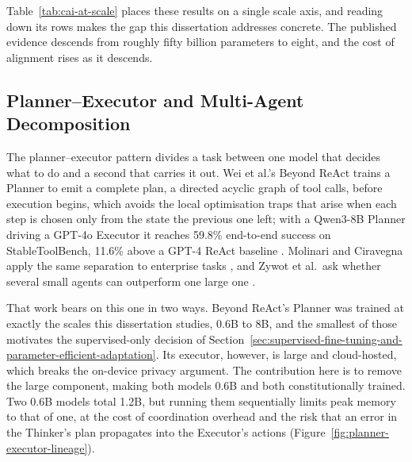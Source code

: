 Table~\ref{tab:cai-at-scale} places these results on a single scale axis, and reading down its rows makes the gap this dissertation addresses concrete. The published evidence descends from roughly fifty billion parameters to eight, and the cost of alignment rises as it descends. 

\subsection{Planner--Executor and Multi-Agent Decomposition}
\label{sec:sota-planner-executor}

The planner--executor pattern divides a task between one model that decides what to do and a second that carries it out. Wei et al.'s Beyond ReAct trains a Planner to emit a complete plan, a directed acyclic graph of tool calls, before execution begins, which avoids the local optimisation traps that arise when each step is chosen only from the state the previous one left; with a Qwen3-8B Planner driving a GPT-4o Executor it reaches 59.8\% end-to-end success on StableToolBench, 11.6\% above a GPT-4 ReAct baseline \cite{wei2025reactplannercentricframeworkcomplex}. Molinari and Ciravegna apply the same separation to enterprise tasks \cite{molinari2025reasonplanreactreasonerplannersupervisingreact}, and Zywot et al.\ ask whether several small agents can outperform one large one \cite{zywot2026smallagentscollaboratebeat}. 

That work bears on this one in two ways. Beyond ReAct's Planner was trained at exactly the scales this dissertation studies, 0.6B to 8B, and the smallest of those motivates the supervised-only decision of Section~\ref{sec:supervised-fine-tuning-and-parameter-efficient-adaptation}. Its executor, however, is large and cloud-hosted, which breaks the on-device privacy argument. The contribution here is to remove the large component, making both models 0.6B and both constitutionally trained. Two 0.6B models total 1.2B, but running them sequentially limits peak memory to that of one, at the cost of coordination overhead and the risk that an error in the Thinker's plan propagates into the Executor's actions (Figure~\ref{fig:planner-executor-lineage}).

